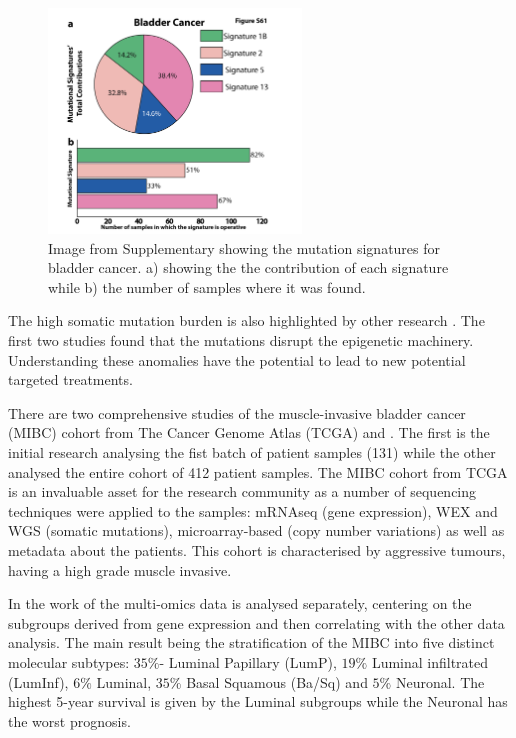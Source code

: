 \begin{figure}[!htb]    
    \centering
\includegraphics[width=0.6\textwidth,height=0.6\textheight,keepaspectratio]{Sections/Lit_review/Resources/bladder_mut_sig.png}
    \caption{Image from Supplementary \cite{Alexandrov2013-gi} showing the mutation signatures for bladder cancer. a) showing the the contribution of each signature while b) the number of samples where it was found. }
    \label{fig:lit:bladder_mut_sig}
\end{figure}


The high somatic mutation burden is also highlighted by other research \cite{Cancer_Genome_Atlas_Research_Network2014-hb, Robertson2017-mg, Kamoun2020-tj}. The first two studies found that the mutations disrupt the epigenetic machinery. Understanding these anomalies have the potential to lead to new potential targeted treatments.

There are two comprehensive studies of the muscle-invasive bladder cancer (MIBC) cohort from The Cancer Genome Atlas (TCGA) \citet{Cancer_Genome_Atlas_Research_Network2014-hb} and \citet{Robertson2017-mg}. The first is the initial research analysing the fist batch of patient samples (131) while the other analysed the entire cohort of 412 patient samples. The MIBC cohort from TCGA is an invaluable asset for the research community as a number of sequencing techniques were applied to the samples: mRNAseq (gene expression), WEX and WGS (somatic mutations), microarray-based (copy number variations) as well as metadata about the patients. This cohort is characterised by aggressive tumours, having a high grade muscle invasive.

In the work of \citet{Robertson2017-mg} the multi-omics data is analysed separately, centering on the subgroups derived from gene expression and then correlating with the other data analysis. The main result being the stratification of the MIBC into five distinct molecular subtypes: $35\%$- Luminal Papillary (LumP), $19\%$ Luminal infiltrated (LumInf), $6\%$ Luminal, $35\%$ Basal Squamous (Ba/Sq) and $5\%$ Neuronal. The highest 5-year survival is given by the Luminal subgroups while the Neuronal has the worst prognosis. 

